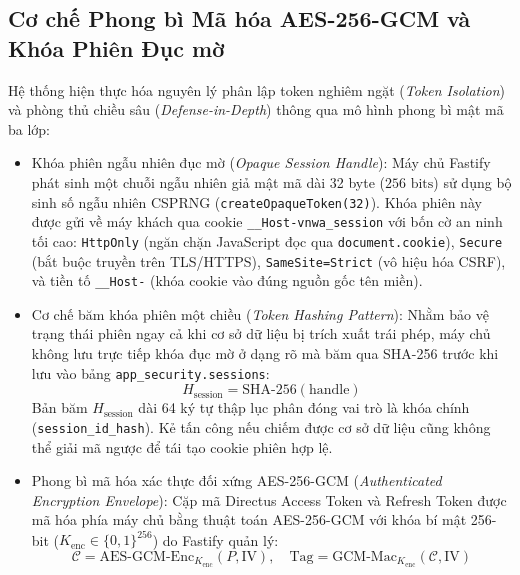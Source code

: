 \subsection{Cơ chế Phong bì Mã hóa AES-256-GCM và Khóa Phiên Đục mờ}
\label{subsec:crypto_envelope_vi}
Hệ thống hiện thực hóa nguyên lý phân lập token nghiêm ngặt (\textit{Token Isolation}) và phòng thủ chiều sâu (\textit{Defense-in-Depth}) thông qua mô hình phong bì mật mã ba lớp:
\begin{itemize}
    \item[-] Khóa phiên ngẫu nhiên đục mờ (\textit{Opaque Session Handle}): Máy chủ Fastify phát sinh một chuỗi ngẫu nhiên giả mật mã dài 32 byte ($256\text{ bits}$) sử dụng bộ sinh số ngẫu nhiên CSPRNG (\texttt{createOpaque}\allowbreak\texttt{Token(32)}). Khóa phiên này được gửi về máy khách qua cookie \texttt{\_\_Host-\allowbreak vnwa\_\allowbreak session} với bốn cờ an ninh tối cao: \texttt{HttpOnly} (ngăn chặn JavaScript đọc qua \texttt{document.}\allowbreak\texttt{cookie}), \texttt{Secure} (bắt buộc truyền trên TLS/HTTPS), \texttt{SameSite=Strict} (vô hiệu hóa CSRF), và tiền tố \texttt{\_\_Host-} (khóa cookie vào đúng nguồn gốc tên miền).
    \item[-] Cơ chế băm khóa phiên một chiều (\textit{Token Hashing Pattern}): Nhằm bảo vệ trạng thái phiên ngay cả khi cơ sở dữ liệu bị trích xuất trái phép, máy chủ không lưu trực tiếp khóa đục mờ ở dạng rõ mà băm qua SHA-256 trước khi lưu vào bảng \texttt{app\_security.}\allowbreak\texttt{sessions}:
    \begin{equation}
    \label{eq:session_hash_vi}
    H_{\text{session}} = \text{SHA-256}(\text{handle})
    \end{equation}
    Bản băm $H_{\text{session}}$ dài 64 ký tự thập lục phân đóng vai trò là khóa chính (\texttt{session\_}\allowbreak\texttt{id\_}\allowbreak\texttt{hash}). Kẻ tấn công nếu chiếm được cơ sở dữ liệu cũng không thể giải mã ngược để tái tạo cookie phiên hợp lệ.
    \item[-] Phong bì mã hóa xác thực đối xứng AES-256-GCM (\textit{Authenticated Encryption Envelope}): Cặp mã Directus Access Token và Refresh Token được mã hóa phía máy chủ bằng thuật toán AES-256-GCM với khóa bí mật 256-bit ($K_{\text{enc}} \in \{0, 1\}^{256}$) do Fastify quản lý:
    \begin{equation}
    \label{eq:aes_gcm_vi}
    \mathcal{C} = \text{AES-GCM-Enc}_{K_{\text{enc}}}(P, \text{IV}), \quad \text{Tag} = \text{GCM-Mac}_{K_{\text{enc}}}(\mathcal{C}, \text{IV})
    \end{equation}

\end{itemize}
